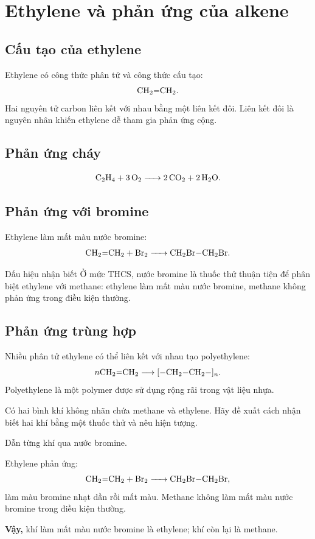 \section{Ethylene và phản ứng của alkene}

\subsection{Cấu tạo của ethylene}

Ethylene có công thức phân tử  và công thức cấu tạo:
\[
\ce{CH2=CH2}.
\]
Hai nguyên tử carbon liên kết với nhau bằng một liên kết đôi. Liên kết đôi là nguyên nhân khiến ethylene dễ tham gia phản ứng cộng.

\subsection{Phản ứng cháy}

\[
\ce{C2H4 + 3O2 -> 2CO2 + 2H2O}.
\]

\subsection{Phản ứng với bromine}

Ethylene làm mất màu nước bromine:
\[
\ce{CH2=CH2 + Br2 -> CH2Br-CH2Br}.
\]

\begin{ghinho}{Dấu hiệu nhận biết}
Ở mức THCS, nước bromine là thuốc thử thuận tiện để phân biệt ethylene với methane: ethylene làm mất màu nước bromine, methane không phản ứng trong điều kiện thường.
\end{ghinho}

\subsection{Phản ứng trùng hợp}

Nhiều phân tử ethylene có thể liên kết với nhau tạo polyethylene:
\[
n\ce{CH2=CH2}\longrightarrow \ce{[-CH2-CH2-]_{n}}.
\]
Polyethylene là một polymer được sử dụng rộng rãi trong vật liệu nhựa.

\begin{vidu}
Có hai bình khí không nhãn chứa methane và ethylene. Hãy đề xuất cách nhận biết hai khí bằng một thuốc thử và nêu hiện tượng.
\end{vidu}
\begin{loigiai}
Dẫn từng khí qua nước bromine.

Ethylene phản ứng:
\[
\ce{CH2=CH2 + Br2 -> CH2Br-CH2Br},
\]
làm màu bromine nhạt dần rồi mất màu. Methane không làm mất màu nước bromine trong điều kiện thường.

\textbf{Vậy,} khí làm mất màu nước bromine là ethylene; khí còn lại là methane.
\end{loigiai}

